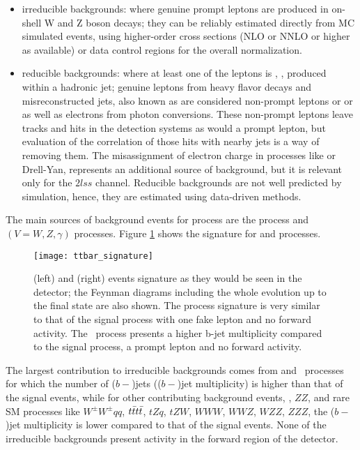 \begin{itemize}

\item irreducible backgrounds: where genuine prompt leptons are produced in on-shell W and Z boson decays; they can be reliably estimated directly from MC simulated events, using higher-order cross sections (NLO or NNLO or higher as available) or data control regions for the overall normalization.

\item reducible backgrounds: where at least one of the leptons is , \ie, produced within a hadronic jet; genuine leptons from heavy flavor decays and misreconstructed jets, also known as  are considered non-prompt leptons or or  as well as electrons from photon conversions. These non-prompt leptons leave tracks and hits in the detection systems as would a prompt lepton, but evaluation of the correlation of those hits with nearby jets is a way of removing them. The misassignment of electron charge in processes like \ttbar or Drell-Yan, represents an additional source of background, but it is relevant only for the $2lss$ channel. Reducible backgrounds are not well predicted by simulation, hence, they are estimated using data-driven methods. 
\end{itemize}

The main sources of background events for \tHq process are the \ttbar process and \ttV $(V=W,Z,\gamma)$ processes. Figure \ref{fig:ttbar_sign} shows the signature for \ttbar and \ttW processes.     

\begin{figure}[!htb]
\centering
\texttt{[image: ttbar\_signature]}
\caption[\ttbar and \ttW events signature]{\ttbar(left) and \ttW (right) events signature as they would be seen in the detector; the Feynman diagrams including the whole evolution up to the final state are also shown. The \ttbar process signature is very similar to that of the signal process with one fake lepton and no forward activity. The \ttW\ process presents a higher b-jet multiplicity compared to the signal process, a prompt lepton and no forward activity.}
\label{fig:ttbar_sign}
\end{figure}

The largest contribution to irreducible backgrounds comes from \ttW and \ttZ\ processes for which the number of ($b-$)jets (($b-$)jet multiplicity) is higher than that of the signal events, while for other contributing background events,  \WZ, $ZZ$, and rare SM processes like $W^\pm W^\pm qq$, $t\bar{t}t\bar{t}$, $tZq$, $tZW$, $WWW$, $WWZ$, $WZZ$, $ZZZ$, the ($b-$)jet multiplicity is lower compared to that of the signal events. None of the irreducible backgrounds present activity in the forward region of the detector.


